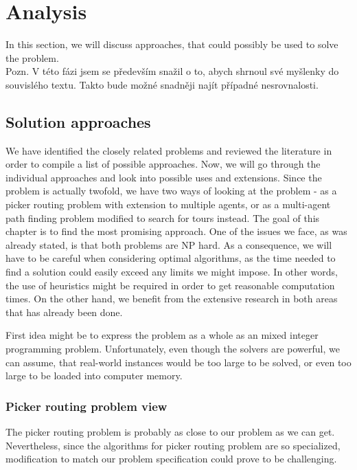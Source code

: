 \chapter{Analysis}
In this section, we will discuss approaches, that could possibly be used to solve the problem. \\
Pozn. V této fázi jsem se především snažil o to, abych shrnoul své myšlenky do souvislého textu. Takto bude možné snadněji najít případné nesrovnalosti.
\section{Solution approaches}
We have identified the closely related problems and reviewed the literature in order to compile a list of possible approaches. Now, we will go through the individual approaches and look into possible uses and extensions. Since the problem is actually twofold, we have two ways of looking at the problem - as a picker routing problem with extension to multiple agents, or as a multi-agent path finding problem modified to search for tours instead. The goal of this chapter is to find the most promising approach. One of the issues we face, as was already stated, is that both problems are NP hard. As a consequence, we will have to be careful when considering optimal algorithms, as the time needed to find a solution could easily exceed any limits we might impose. In other words, the use of heuristics might be required in order to get reasonable computation times. On the other hand, we benefit from the extensive research in both areas that has already been done. 
\par
First idea might be to express the problem as a whole as an mixed integer programming problem. Unfortunately, even though the solvers are powerful, we can assume, that real-world instances would be too large to be solved, or even too large to be loaded into computer memory.


\subsection{Picker routing problem view}

The picker routing problem is probably as close to our problem as we can get. Nevertheless, since the algorithms for picker routing problem are so specialized, modification to match our problem specification could prove to be challenging. 
